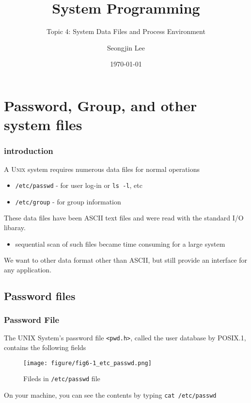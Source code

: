\documentclass[newPxFont,sthlmFooter,nooffset]{beamer}
\title{System Programming}
\subtitle{Topic 4: System Data Files and Process Environment}
\author[SJL]{Seongjin Lee}
\institute{\href{mailto:insight@gnu.ac.kr}{insight@gnu.ac.kr}\\\url{http://open.gnu.ac.kr}\\Systems Research Lab.\\Gyeongsang National University\\Presentor: Gyuri Chang}
\date{\today}
\begin{document}
\frame[plain]{\titlepage}




\section{Password, Group, and other system files}

\begin{frame}[t]
  \frametitle{introduction}
A \textsc{Unix} system requires numerous data files for normal operations
\begin{itemize}
\item \texttt{/etc/passwd} - for user log-in or \texttt{ls -l}, etc
\item \texttt{/etc/group} - for group information
\end{itemize}

These data files have been ASCII text files and were read with the standard I/O libaray.

\begin{itemize}
\item sequential scan of such files became time consuming for a large system
\end{itemize}


We want to other data format other than ASCII, but still provide an interface for any application.

\end{frame}




\subsection{Password files}








\begin{frame}[containsverbatim,t]
  \frametitle{Password File}

The UNIX System’s password file \texttt{<pwd.h>}, called the user database by POSIX.1, contains the following fields

\begin{figure}[h]
  \centering
  \texttt{[image: figure/fig6-1\_etc\_passwd.png]}
  \caption{Fileds in \texttt{/etc/passwd} file}
\end{figure}
\vspace{-1em}

On your machine, you can see the contents by typing \texttt{cat /etc/passwd}


\end{frame}
\end{document}
